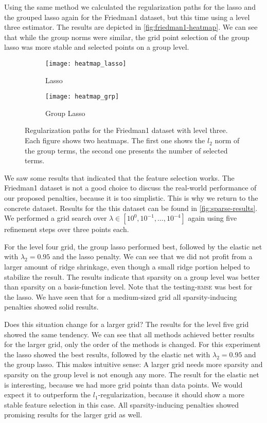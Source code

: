 Using the same method we calculated the regularization paths for the lasso and
the grouped lasso again for the Friedman1 dataset, but this time using a level
three estimator.
The results are depicted in \vref{fig:friedman1-heatmap}.
We can see that while the group norms were similar, the grid point selection of
the group lasso was more stable and selected points on a group level.

\begin{figure}[p]
  \begin{subfigure}[t]{0.5\textwidth}
    \centering
    \texttt{[image: heatmap\_lasso]}
    \caption{Lasso}
  \end{subfigure}\qquad
  \begin{subfigure}[t]{0.5\textwidth}
    \centering
    \texttt{[image: heatmap\_grp]}
    \caption{Group Lasso}
  \end{subfigure}
  \caption{Regularization paths for the Friedman1 dataset with level three.
  Each figure shows two heatmaps.
  The first one shows the \(l_2\) norm of the group terms, the second one presents the number of selected terms.}\label{fig:friedman1-heatmap}
\end{figure}

We saw some results that indicated that the feature selection works.
The Friedman1 dataset is not a good choice to discuss the real-world performance
of our proposed penalties, because it is too simplistic.
This is why we return to the concrete dataset.
Results for the this dataset can be found in \cref{fig:sparse-results}.
We performed a grid search over \(\lambda \in [10^{0}, 10^{-1}, \ldots,
10^{-4}]\) again using five refinement steps over three points each.

For the level four grid, the group lasso performed best, followed by the elastic
net with \(\lambda_2 = 0.95\) and the lasso penalty.
We can see that we did not profit from a larger amount of ridge shrinkage, even
though a small ridge portion helped to stabilize the result.
The results indicate that sparsity on a group level was better than sparsity on a
basis-function level.
Note that the testing-\textsc{rmse} was best for the lasso.
We have seen that for a medium-sized grid all sparsity-inducing penalties showed
solid results.

Does this situation change for a larger grid?
The results for the level five grid showed the same tendency.
We can see that all methods achieved better results for the larger grid, only
the order of the methods is changed.
For this experiment the lasso showed the best results, followed by the elastic net with
\(\lambda_2 = 0.95\) and the group lasso.
This makes intuitive sense:
A larger grid needs more sparsity and sparsity on the group level is not enough
any more.
The result for the elastic net is interesting, because we had more grid points
than data points.
We would expect it to outperform the \(l_1\)-regularization, because it should show a more stable feature selection in this case.
All sparsity-inducing penalties showed promising results for the larger grid as well.

